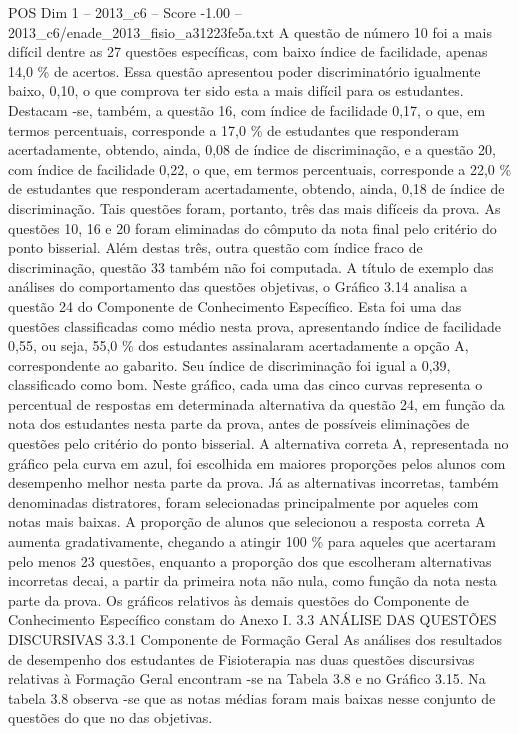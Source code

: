 \begin{textsample}{POS Dim 1 – 2013\_c6 – Score -1.00 – 2013\_c6/enade\_2013\_fisio\_a31223fe5a.txt}
A questão de número 10 foi a mais difícil dentre as 27 questões específicas, com baixo índice de facilidade, apenas 14,0 \% de acertos.
Essa questão apresentou poder discriminatório igualmente baixo, 0,10, o que comprova ter sido esta a mais difícil para os estudantes.
Destacam -se, também, a questão 16, com índice de facilidade 0,17, o que, em termos percentuais, corresponde a 17,0 \% de estudantes que responderam acertadamente, obtendo, ainda, 0,08 de índice de discriminação, e a questão 20, com índice de facilidade 0,22, o que, em termos percentuais, corresponde a 22,0 \% de estudantes que responderam acertadamente, obtendo, ainda, 0,18 de índice de discriminação.
Tais questões foram, portanto, três das mais difíceis da prova.
As questões 10, 16 e 20 foram eliminadas do cômputo da nota final pelo critério do ponto bisserial.
Além destas três, outra questão com índice fraco de discriminação, questão 33 também não foi computada.
A título de exemplo das análises do comportamento das questões objetivas, o Gráfico 3.14 analisa a questão 24 do Componente de Conhecimento Específico.
Esta foi uma das questões classificadas como médio nesta prova, apresentando índice de facilidade 0,55, ou seja, 55,0 \% dos estudantes assinalaram acertadamente a opção A, correspondente ao gabarito.
Seu índice de discriminação foi igual a 0,39, classificado como bom.
Neste gráfico, cada uma das cinco curvas representa o percentual de respostas em determinada alternativa da questão 24, em função da nota dos estudantes nesta parte da prova, antes de possíveis eliminações de questões pelo critério do ponto bisserial.
A alternativa correta A, representada no gráfico pela curva em azul, foi escolhida em maiores proporções pelos alunos com desempenho melhor nesta parte da prova.
Já as alternativas incorretas, também denominadas distratores, foram selecionadas principalmente por aqueles com notas mais baixas.
A proporção de alunos que selecionou a resposta correta A aumenta gradativamente, chegando a atingir 100 \% para aqueles que acertaram pelo menos 23 questões, enquanto a proporção dos que escolheram alternativas incorretas decai, a partir da primeira nota não nula, como função da nota nesta parte da prova.
Os gráficos relativos às demais questões do Componente de Conhecimento Específico constam do Anexo I. 3.3 ANÁLISE DAS QUESTÕES DISCURSIVAS 3.3.1 Componente de Formação Geral As análises dos resultados de desempenho dos estudantes de Fisioterapia nas duas questões discursivas relativas à Formação Geral encontram -se na Tabela 3.8 e no Gráfico 3.15.
Na tabela 3.8 observa -se que as notas médias foram mais baixas nesse conjunto de questões do que no das objetivas.

\end{textsample}
